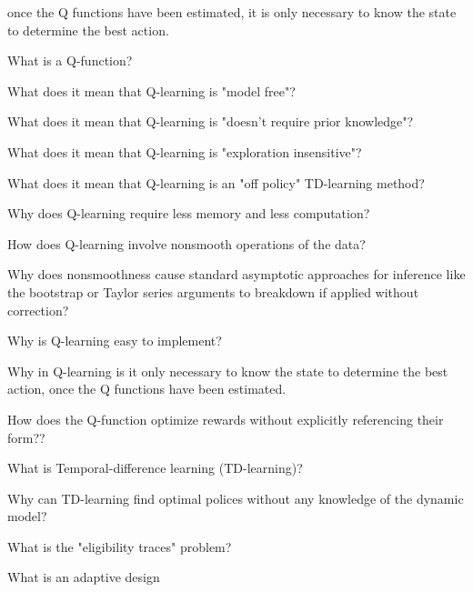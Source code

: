 \documentclass[10pt]{article}
\begin{document}
once the Q functions have been estimated, it is only necessary to know the state to determine the best action.

\hrulefill

What is a Q-function?

\hrulefill

What does it mean that Q-learning is "model free"?

\hrulefill

What does it mean that Q-learning is "doesn't require prior knowledge"?

\hrulefill

What does it mean that Q-learning is "exploration insensitive"?

\hrulefill

What does it mean that Q-learning is an "off policy" TD-learning method?

\hrulefill

Why does Q-learning require less memory and less computation?

\hrulefill

How does Q-learning involve nonsmooth operations of the data?

\hrulefill

Why does nonsmoothness cause standard asymptotic approaches for inference like the bootstrap or Taylor series arguments to breakdown if applied without correction?

\hrulefill

Why is Q-learning easy to implement?

\hrulefill

Why in Q-learning is it only necessary to know the state to determine the best action, once the Q functions have been estimated.

\hrulefill

How does the Q-function optimize rewards without explicitly referencing their form??

\hrulefill

What is Temporal-difference learning (TD-learning)?

\hrulefill

Why can TD-learning find optimal polices without any knowledge of the dynamic model?

\hrulefill

What is the "eligibility traces" problem?

\hrulefill

What is an adaptive design

\hrulefill
\end{document}
